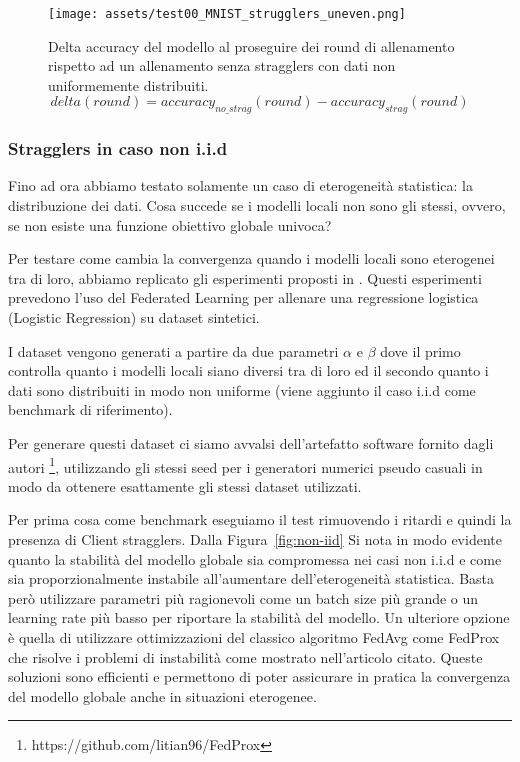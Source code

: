 \documentclass[a4paper, oneside, openright]{report}
\begin{document}
\begin{figure}[h!]
\centering
\texttt{[image: assets/test00\_MNIST\_strugglers\_uneven.png]}
\caption{Delta accuracy del modello al proseguire dei round di allenamento rispetto ad un allenamento senza stragglers con dati non uniformemente distribuiti. $$delta(round) = accuracy_{no\_strag}(round) - accuracy_{strag}(round) $$}\label{fig:t00_MNIST_strugglers_uneven}
\end{figure}



\subsubsection{Stragglers in caso non i.i.d}
Fino ad ora abbiamo testato solamente un caso di eterogeneità statistica: la distribuzione dei dati. Cosa succede se i modelli locali non sono gli stessi, ovvero, se non esiste una funzione obiettivo globale univoca?

Per testare come cambia la convergenza quando i modelli locali sono eterogenei tra di loro, abbiamo replicato gli esperimenti proposti in \cite{DBLP:journals/corr/abs-1812-06127}. Questi esperimenti prevedono l'uso del Federated Learning per allenare una regressione logistica (Logistic Regression) su dataset sintetici.

I dataset vengono generati a partire da due parametri $\alpha$ e $\beta$ dove il primo controlla quanto i modelli locali siano diversi tra di loro ed il secondo quanto i dati sono distribuiti in modo non uniforme (viene aggiunto il caso i.i.d come benchmark di riferimento). 

Per generare questi dataset ci siamo avvalsi dell'artefatto software fornito dagli autori \footnote{https://github.com/litian96/FedProx}, utilizzando gli stessi seed per i generatori numerici pseudo casuali in modo da ottenere esattamente gli stessi dataset utilizzati.

Per prima cosa come benchmark eseguiamo il test rimuovendo i ritardi e quindi la presenza di Client stragglers. Dalla Figura~\ref{fig:non-iid} Si nota in modo evidente quanto la stabilità del modello globale sia compromessa nei casi non i.i.d e come sia proporzionalmente instabile all'aumentare dell'eterogeneità statistica. Basta però utilizzare parametri più ragionevoli come un batch size più grande o un learning rate più basso per riportare la stabilità del modello. Un ulteriore opzione è quella di utilizzare ottimizzazioni del classico algoritmo FedAvg come FedProx che risolve i problemi di instabilità come mostrato nell'articolo citato. Queste soluzioni sono efficienti e permettono di poter assicurare in pratica la convergenza del modello globale anche in situazioni eterogenee. \\
\end{document}
